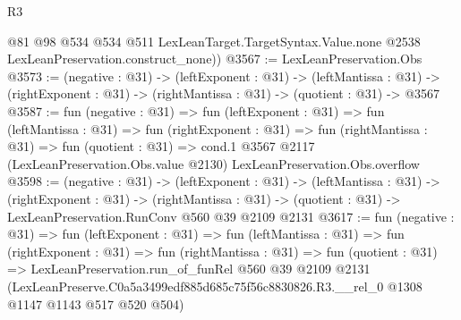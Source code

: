 \begin{lexlean}{R3}
\begin{coremodule}
        @81
        @98
        @534
        @534
        @511
        LexLeanTarget.TargetSyntax.Value.none
        @2538
        LexLeanPreservation.construct_none))
@3567 := LexLeanPreservation.Obs
@3573 := (negative : @31) ->
  (leftExponent : @31) ->
  (leftMantissa : @31) ->
  (rightExponent : @31) -> (rightMantissa : @31) -> (quotient : @31) -> @3567
@3587 := fun (negative : @31) =>
  fun (leftExponent : @31) =>
  fun (leftMantissa : @31) =>
  fun (rightExponent : @31) =>
  fun (rightMantissa : @31) =>
  fun (quotient : @31) =>
  cond.{1} @3567 @2117 (LexLeanPreservation.Obs.value @2130) LexLeanPreservation.Obs.overflow
@3598 := (negative : @31) ->
  (leftExponent : @31) ->
  (leftMantissa : @31) ->
  (rightExponent : @31) ->
  (rightMantissa : @31) -> (quotient : @31) -> LexLeanPreservation.RunConv @560 @39 @2109 @2131
@3617 := fun (negative : @31) =>
  fun (leftExponent : @31) =>
  fun (leftMantissa : @31) =>
  fun (rightExponent : @31) =>
  fun (rightMantissa : @31) =>
  fun (quotient : @31) =>
  LexLeanPreservation.run_of_funRel
    @560
    @39
    @2109
    @2131
    (LexLeanPreserve.C0a5a3499edf885d685c75f56c8830826.R3.__rel_0 @1308 @1147 @1143 @517 @520 @504)
\end{coremodule}
\end{lexlean}

